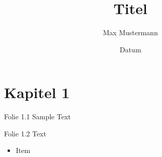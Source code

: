 \documentclass[aspectratio=1610, professionalfonts, 9pt, t]{beamer}
\title{Titel}
\author[M.~Mustermann]{Max Mustermann}
\date{Datum}
\institute[Fakultät Physik (oder Lehrstuhl)]{Lehrstuhl \\  Fakultät Physik}
\begin{document}
\maketitle

\section{Kapitel 1}
  \begin{frame}{Folie 1.1}
    Sample Text
  \end{frame}

  \begin{frame}{Folie 1.2}
    Text
    \begin{itemize}
     \item Item
    \end{itemize}
  \end{frame}


\end{document}
